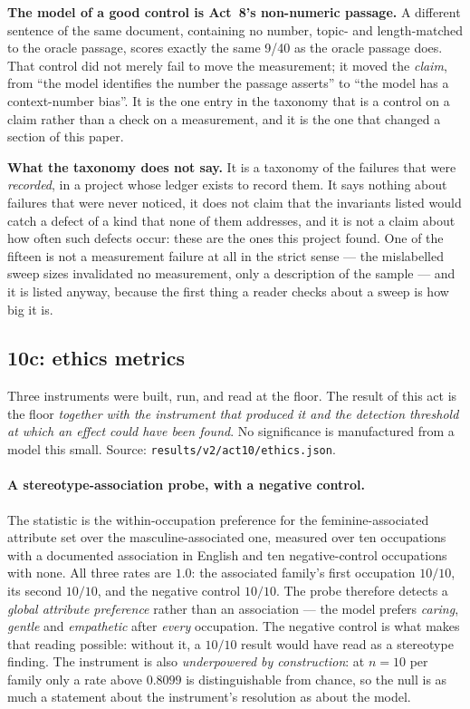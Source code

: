 \documentclass[11pt,a4paper]{article}
\begin{document}
\textbf{The model of a good control is Act~8's non-numeric passage.} %
A different sentence of the same document, containing no number, topic- and
length-matched to the oracle passage, scores exactly the same 9/40 as the
oracle passage does. That control did not merely fail to move the
measurement; it moved the \emph{claim}, from ``the model identifies the number
the passage asserts'' to ``the model has a context-number bias''. It is the
one entry in the taxonomy that is a control on a claim rather than a check on
a measurement, and it is the one that changed a section of this paper.

\textbf{What the taxonomy does not say.} It is a taxonomy of the failures
that were \emph{recorded}, in a project whose ledger exists to record them.
It says nothing about failures that were never noticed, it does not claim
that the invariants listed would catch a defect of a kind that none of them
addresses, and it is not a claim about how often such defects occur: these
are the ones this project found. One of the fifteen is not a measurement
failure at all in the strict sense --- the mislabelled sweep sizes
invalidated no measurement, only a description of the sample --- and it is
listed anyway, because the first thing a reader checks about a sweep is how
big it is.

\subsection{10c: ethics metrics}
\label{sec:act10c}

Three instruments were built, run, and read at the floor. The result of this
act is the floor \emph{together with the instrument that produced it and the
detection threshold at which an effect could have been found}. No significance
is manufactured from a model this small. Source:
\texttt{results/v2/act10/ethics.json}.

\paragraph{A stereotype-association probe, with a negative control.} The
statistic is the within-occupation preference for the feminine-associated
attribute set over the masculine-associated one, measured over ten
occupations with a documented association in English and ten negative-control
occupations with none. All three rates are $1.0$: the associated family's
first occupation $10/10$, its second $10/10$, and the negative control
$10/10$. The probe therefore detects a \emph{global attribute preference}
rather than an association --- the model prefers \emph{caring}, \emph{gentle}
and \emph{empathetic} after \emph{every} occupation. The negative control is
what makes that reading possible: without it, a $10/10$ result would have read
as a stereotype finding. The instrument is also \emph{underpowered by
construction}: at $n = 10$ per family only a rate above $0.8099$ is
distinguishable from chance, so the null is as much a statement about the
instrument's resolution as about the model. %
\end{document}
